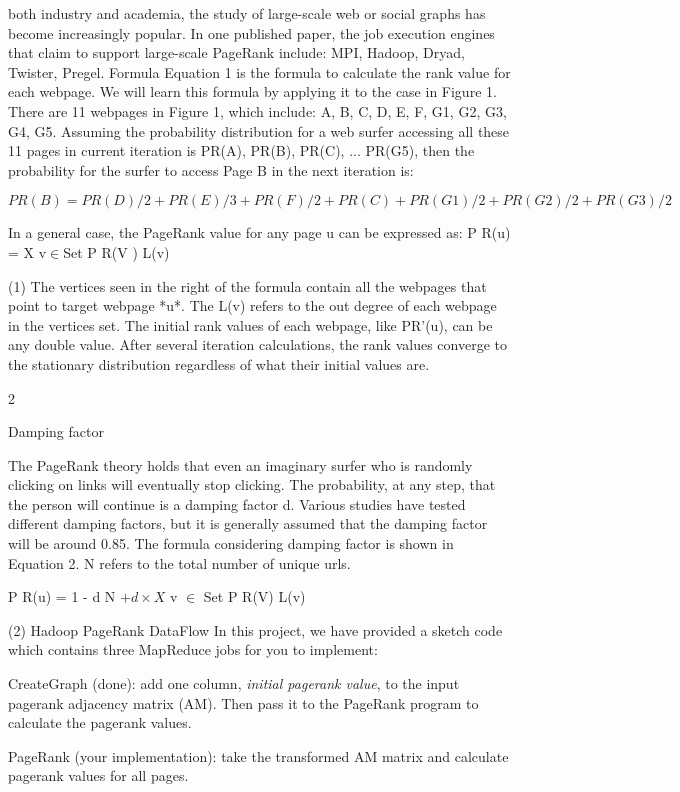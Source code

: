 both industry and academia, the study of large-scale web or social graphs has become increasingly popular.
In one published paper, the job execution engines that claim to support large-scale PageRank include: MPI,
Hadoop, Dryad, Twister, Pregel.
Formula
Equation 1 is the formula to calculate the rank value for each webpage. We will learn this formula by
applying it to the case in Figure 1. There are 11 webpages in Figure 1, which include: A, B, C, D, E, F,
G1, G2, G3, G4, G5. Assuming the probability distribution for a web surfer accessing all these 11 pages in
current iteration is {PR(A), PR(B), PR(C), ... PR(G5)}, then the probability for the surfer to access Page
B in the next iteration is:

\[ PR(B) = P R(D)/2 + P R(E)/3 + P R(F)/2 + P R(C) + P R(G1)/2 + P R(G2)/2 + P R(G3)/2\]

In a general case, the PageRank value for any page u can be expressed as:
P R(u) = X
v$\in$Set
P R(V )
L(v)

(1) The vertices seen in the right of the formula contain all the
webpages that point to target webpage *u*.  The L(v) refers to the out
degree of each webpage in the vertices set. The initial rank values of
each webpage, like PR'(u), can be any double value. After several
iteration calculations, the rank values converge to the stationary
distribution regardless of what their initial values are.

2

Damping factor

The PageRank theory holds that even an imaginary surfer who is
randomly clicking on links will eventually stop clicking. The
probability, at any step, that the person will continue is a damping
factor d. Various studies have tested different damping factors, but
it is generally assumed that the damping factor will be around
0.85. The formula considering damping factor is shown in Equation 2. N
refers to the total number of unique urls.

P R(u) = 1 - d
N
$+ d \times X$
v $\in$ Set
P R(V)
L(v)

(2)
Hadoop PageRank DataFlow
In this project, we have provided a sketch code which contains three
MapReduce jobs for you to implement:

\item CreateGraph (done): add one column, \emph{initial pagerank value}, to
the input pagerank adjacency matrix (AM). Then pass it to the PageRank
program to calculate the pagerank values.  

\item PageRank (your
implementation): take the transformed AM matrix and calculate pagerank
values for all pages.

